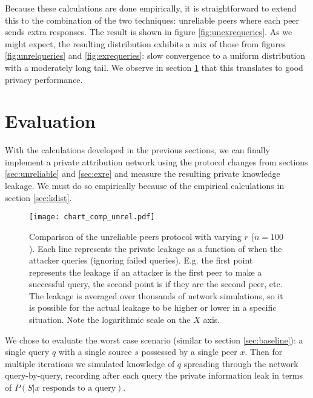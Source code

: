 \documentclass{article}
\newcommand{\secref}[1]{section \ref{sec:#1}}
\newcommand{\figref}[1]{figure \ref{fig:#1}}
\begin{document}
Because these calculations are done empirically, it is straightforward to extend this to
the combination of the two techniques: unreliable peers where each peer sends
extra responses. The result is shown in \figref{unexrequeries}. As we might expect, the
resulting distribution exhibits a mix of those from figures
\ref{fig:unrelqueries} and \ref{fig:exrequeries}: slow convergence to a uniform
distribution with a moderately long tail. We observe in \secref{eval} that this
translates to good privacy performance.

\section{Evaluation}\label{sec:eval}

With the calculations developed in the previous sections, we can finally
implement a private attribution network using the protocol changes from sections
\ref{sec:unreliable} and \ref{sec:exre} and measure the resulting private
knowledge leakage. We must do so empirically because of the empirical
calculations in \secref{kdist}.

\begin{figure}%
    \centering
	\texttt{[image: chart\_comp\_unrel.pdf]}
	\caption{Comparison of the unreliable peers protocol with varying $r$
	($n=100$). Each line represents the private leakage as a function of when
	the attacker queries (ignoring failed queries). E.g. the first point
	represents the leakage if an attacker is the first peer to make a successful
	query, the second point is if they are the second peer, etc. The leakage is
	averaged over thousands of network simulations, so it is possible for the
	actual leakage to be higher or lower in a specific situation. Note the
	logarithmic scale on the $X$ axis.}
    \label{fig:compunrel}%
\end{figure}

We chose to evaluate the worst case scenario (similar to \secref{baseline}): a
single query $q$ with a single source $s$ possessed by a single peer $x$. Then
for multiple iterations we simulated knowledge of $q$ spreading through the
network query-by-query, recording after each query the private information leak
in terms of $P(S|\text{$x$ responds to a query})$.
\end{document}
